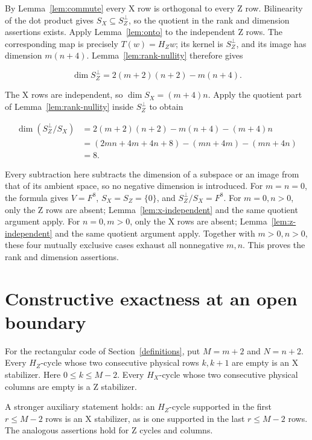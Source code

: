 \documentclass{article}
\begin{document}
By Lemma~\ref{lem:commute} every X row is orthogonal to every Z row. Bilinearity of the
dot product gives \(S_X\subseteq S_Z^\perp\), so the quotient in the
rank and dimension assertions exists. Apply Lemma~\ref{lem:onto} to the independent Z
rows. The corresponding map is precisely \(T(w)=H_Zw\); its kernel is
\(S_Z^\perp\), and its image has dimension \(m(n+4)\). Lemma~\ref{lem:rank-nullity} therefore
gives

\begin{equation}
 \dim S_Z^\perp=2(m+2)(n+2)-m(n+4).
\end{equation}

The X rows are independent, so \(\dim  S_X=(m+4)n\). Apply the quotient
part of Lemma~\ref{lem:rank-nullity} inside \(S_Z^\perp\) to obtain

\begin{equation}
\begin{aligned}
 \dim(S_Z^\perp/S_X)
 &=2(m+2)(n+2)-m(n+4)-(m+4)n\\
 &=(2mn+4m+4n+8)-(mn+4m)-(mn+4n)\\
 &=8.
\end{aligned}
\end{equation}

Every subtraction here subtracts the dimension of a subspace or an image
from that of its ambient space, so no negative dimension is introduced.
For \(m=n=0\), the formula gives \(V=F^8\), \(S_X=S_Z=\{0\}\), and
\(S_Z^\perp/S_X=F^8\). For \(m=0,n>0\), only the Z rows are absent;
Lemma~\ref{lem:x-independent} and the same quotient argument apply. For \(n=0,m>0\), only the
X rows are absent; Lemma~\ref{lem:z-independent} and the same quotient argument apply.
Together with \(m>0,n>0\), these four mutually exclusive cases exhaust
all nonnegative \(m,n\). This proves the rank and dimension assertions.

\section{Constructive exactness at an open boundary}\label{constructive-exactness-at-an-open-boundary}

For the rectangular code of Section~\ref{definitions}, put \(M=m+2\) and \(N=n+2\).
Every \(H_Z\)-cycle whose two consecutive physical rows \(k,k+1\) are
empty is an X stabilizer. Here \(0\le k\le M-2\). Every \(H_X\)-cycle
whose two consecutive physical columns are empty is a Z stabilizer.

A stronger auxiliary statement holds: an \(H_Z\)-cycle supported in the
first \(r\le M-2\) rows is an X stabilizer, as is one supported in the
last \(r\le M-2\) rows. The analogous assertions hold for Z cycles and
columns.
\end{document}

